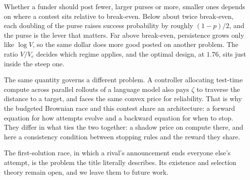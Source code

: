 \documentclass[11pt]{article}
\theoremstyle{itheads}
\begin{document}
Whether a funder should post fewer, larger purses or more, smaller ones
depends on where a contest sits relative to break-even. Below about twice
break-even, each doubling of the purse raises success probability by
roughly $(1-p)/2$, and the purse is the lever that matters. Far above
break-even, persistence grows only like $\log V$, so the same dollar does
more good posted on another problem. The ratio $V/V_{e}$ decides which
regime applies, and the optimal design, at $1.76$, sits just inside the
steep one.

The same quantity governs a different problem. A controller allocating
test-time compute across parallel rollouts of a language model also pays
$\zeta$ to traverse the distance to a target, and faces the same convex
price for reliability. That is why the budgeted Brownian race
\citep{cotton2026wavefront} and this contest share an architecture: a
forward equation for how attempts evolve and a backward equation for when
to stop. They differ in what ties the two together: a shadow price on
compute there, and here a consistency condition between stopping rules and
the reward they share.

The first-solution race, in which a rival's announcement ends everyone
else's attempt, is the problem the title literally describes. Its
existence and selection theory remain open, and we leave them to future
work.
\end{document}
